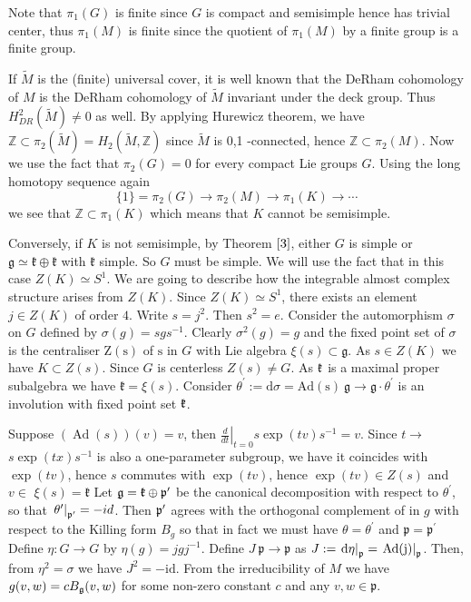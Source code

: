 Note that $\pi_{1}(G)$ is finite since $G$ is compact and
semisimple hence has trivial center, thus $\pi_{1}(M)$ is finite
since the quotient of $\pi_{1}(M)$ by a finite group is a finite
group.

If $\tilde{M}$ is the (finite) universal cover, it is well known
that the DeRham cohomology of $M$ is the DeRham cohomology of
$\tilde{M}$ invariant under the deck group. Thus $H_{D
R}^{2}(\tilde{M}) \neq 0$ as well. By applying Hurewicz theorem,
we have $\mathbb{Z} \subset \pi_{2}(\tilde{M})=H_{2}(\tilde{M},
\mathbb{Z})$ since $\tilde{M}$ is 0,1 -connected, hence
$\mathbb{Z} \subset \pi_{2}(M) .$ Now
we use the fact that $\pi_{2}(G)=0$ for every compact Lie groups
$G$. Using the long homotopy sequence again
\[
\{1\}=\pi_{2}(G) \longrightarrow \pi_{2}(M) \longrightarrow
\pi_{1}(K) \longrightarrow \cdots
\]
we see that $\mathbb{Z} \subset \pi_{1}(K)$ which means that $K$
cannot be semisimple.


Conversely, if $K$ is not semisimple, by Theorem $\ref{3}$,
either $G$ is simple or $\mathfrak{g} \simeq \mathfrak{k} \oplus
\mathfrak{k}$ with $\mathfrak{k}$ simple. So $G$ must be simple.
We will use the fact that in this case $Z(K) \simeq S^{1}$. We
are going to describe how the integrable almost complex structure
arises from $Z(K)$. Since $Z(K) \simeq S^{1}$, there exists an
element $j \in Z(K)$ of order $4 .$ Write $s=j^{2}$. Then
$s^{2}=e$. Consider the automorphism $\sigma$ on $G$ defined by
$\sigma(g)=s g s^{-1}$. Clearly $\sigma^{2}(g)=g$ and the fixed
point set of $\sigma$ is the centraliser $\mathrm{Z}(\mathrm{s})$
of $\mathrm{s}$ in $G$ with Lie algebra $\xi(s) \subset
\mathfrak{g} .$ As $s \in Z(K)$ we have $K \subset Z(s) .$ Since
$G$ is centerless $Z(s) \neq G .$ As ${\mathfrak k}$ is a maximal proper
subalgebra we have $\mathfrak{k}=\xi(s)$. Consider
$\theta^{\prime}:=\mathrm{d} \sigma=\mathrm{Ad}(\mathrm{s})\:
\mathfrak{g} \rightarrow \mathfrak{g} \cdot \theta^{\prime}$ is
an involution with fixed point set
${\mathfrak k}$.


 Suppose $(\operatorname{Ad}(s))(v)=v$, then $\left.\frac{d}{d
 t}\right|_{t=0} s \exp (t v) s^{-1}=v .$ Since $t \rightarrow$
$s \exp (t x) s^{-1}$ is also a one-parameter subgroup, we have
it coincides with $\exp (t v)$, hence $s$ commutes with $\exp (t
v)$, hence $\exp (t v) \in Z(s)$ and $v \in$
$\xi(s)=\mathfrak{k}$
Let ${\mathfrak g}={\mathfrak k}\oplus{\mathfrak p}^{\prime}$ be the canonical decomposition
with respect to $\theta^{\prime}$, so that
$\left.\theta^{\prime}\right|_{{\mathfrak p}^{\prime}}=-i d$. Then
${\mathfrak p}^{\prime}$ agrees with the orthogonal complement of in $g$
with
respect to the Killing form $B_{g}$ so that in fact we must have
$\theta=\theta^{\prime}$ and $\mathfrak{p}=\mathfrak{p}^{\prime}$
Define $\eta: G \rightarrow G$ by $\eta(g)=j g j^{-1}$. Define
$J\: \mathfrak{p} \rightarrow \mathfrak{p}$ as
$J:=\left.\mathrm{d}
\eta\right|_{{\mathfrak p}}=\left.\operatorname{Ad}(\mathrm{j})\right|_{{\mathfrak p}}$.
Then, from $\eta^{2}=\sigma$ we have $J^{2}=-\mathrm{id}$. From
the irreducibility of $M$ we have $g(v, w)=c B_{{\mathfrak g}}(v, w)$ for
some non-zero constant $c$ and any $v, w \in \mathfrak{p} .$

